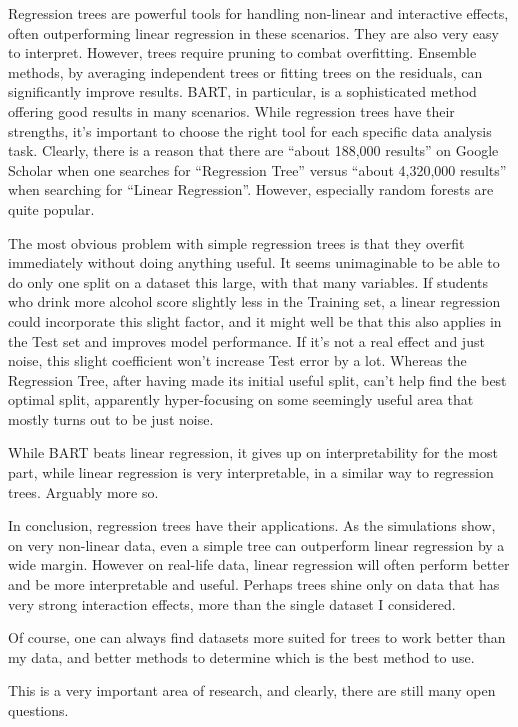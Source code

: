 \documentclass[12pt]{article}
\begin{document}
Regression trees are powerful tools for handling non-linear and interactive effects, often outperforming linear regression in these scenarios. They are also very easy to interpret. However, trees require pruning to combat overfitting. Ensemble methods, by averaging independent trees or fitting trees on the residuals, can significantly improve results. BART, in particular, is a sophisticated method offering good results in many scenarios. While regression trees have their strengths, it's important to choose the right tool for each specific data analysis task. Clearly, there is a reason that there are ``about 188,000 results'' on Google Scholar when one searches for ``Regression Tree'' versus ``about 4,320,000 results'' when searching for ``Linear Regression''. However, especially random forests are quite popular.

The most obvious problem with simple regression trees is that they overfit immediately without doing anything useful. It seems unimaginable to be able to do only one split on a dataset this large, with that many variables. If students who drink more alcohol score slightly less in the Training set, a linear regression could incorporate this slight factor, and it might well be that this also applies in the Test set and improves model performance. If it's not a real effect and just noise, this slight coefficient won't increase Test error by a lot. Whereas the Regression Tree, after having made its initial useful split, can't help find the best optimal split, apparently hyper-focusing on some seemingly useful area that mostly turns out to be just noise.

While BART beats linear regression, it gives up on interpretability for the most part, while linear regression is very interpretable, in a similar way to regression trees. Arguably more so.

In conclusion, regression trees have their applications. As the simulations show, on very non-linear data, even a simple tree can outperform linear regression by a wide margin. However on real-life data, linear regression will often perform better and be more interpretable and useful. Perhaps trees shine only on data that has very strong interaction effects, more than the single dataset I considered.

Of course, one can always find datasets more suited for trees to work better than my data, and better methods to determine which is the best method to use.

This is a very important area of research, and clearly, there are still many open questions.



\end{document}
